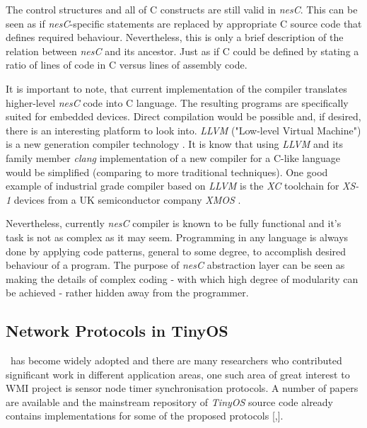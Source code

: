   The control structures and all of C constructs are still valid in
 \emph{nesC}. This can be seen as if \emph{nesC}-specific statements
 are replaced by appropriate C source code that defines required behaviour.
 Nevertheless, this is only a brief description of the relation between
 \emph{nesC} and its ancestor. Just as if C could be defined by stating
 a ratio of lines of code in C versus lines of assembly code.

 It is important to note, that current implementation of the compiler
 translates higher-level \emph{nesC} code into C language. The resulting
 programs are specifically suited for embedded devices. Direct
 compilation would be possible and, if desired, there is an interesting
 platform to look into. \emph{LLVM} ("Low-level Virtual Machine") is a
 new generation compiler technology \cite{links:wiki:llvm}. It is know
 that using \emph{LLVM} and its family member \emph{clang} implementation
 of a new compiler for a C-like language would be simplified (comparing
 to more traditional techniques). One good example of industrial grade
 compiler based on \emph{LLVM} is the \emph{XC} toolchain for \emph{XS-1}
 devices from a UK semiconductor company \emph{XMOS} \cite{links:xmos:tools}.

 Nevertheless, currently \emph{nesC} compiler is known to be fully
 functional and it's task is not as complex as it may seem. Programming
 in any language is always done by applying code patterns, general
 to some degree, to accomplish desired behaviour of a program.
 The purpose of \emph{nesC} abstraction layer can be seen as making
 the details of complex coding - with which high degree of modularity
 can be achieved - rather hidden away from the programmer.


\subsection{Network Protocols in TinyOS}
 
  \TinyOS\ has become widely adopted and there are many researchers
 who contributed significant work in different application areas, one
 such area of great interest to WMI project is sensor node timer
 synchronisation protocols. A number of papers are available \cite{
 Lenzen2010Clock, Lenzen2009Optimal, Sommer2009Gradient, Sommer2008Symmetric}
 and the mainstream repository of \emph{TinyOS} source code already contains
 implementations for some of the proposed protocols [,].

